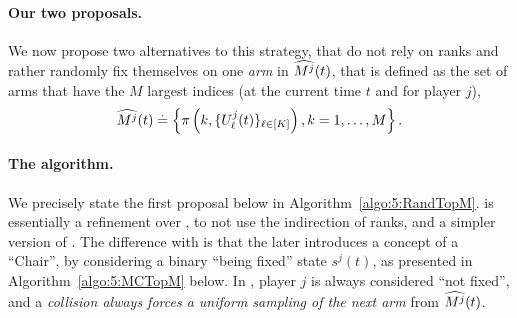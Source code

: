 \paragraph{Our two proposals.}
We now propose two alternatives to this strategy, that do not rely on ranks and rather randomly fix themselves on one \emph{arm} in $\widehat{M^j}(t)$, that is defined as the set of arms that have the $M$ largest indices (at the current time $t$ and for player $j$),
\begin{equation}
  \widehat{M^j}(t) \overset{.}{=} \left\{ \pi\left(k, \{U^j_\ell(t)\}_{\ell\in[K]}\right), k=1,\dots,M\right\}.
\end{equation}

\paragraph{The \RandTopM{} algorithm.}
%
We precisely state the first proposal below in Algorithm~\ref{algo:5:RandTopM}.
%
\RandTopM{} is essentially a refinement over \RhoRand, to not use the indirection of ranks, and a simpler version of \MCTopM.
The difference with \MCTopM{} is that the later introduces a concept of a ``Chair'', by considering a binary ``being fixed'' state $s^j(t)$, as presented in Algorithm~\ref{algo:5:MCTopM} below.
%
In \RandTopM{}, player $j$ is always considered ``not fixed'',
and a \emph{collision always forces a uniform sampling of the next arm} from $\widehat{M^j}(t)$.


